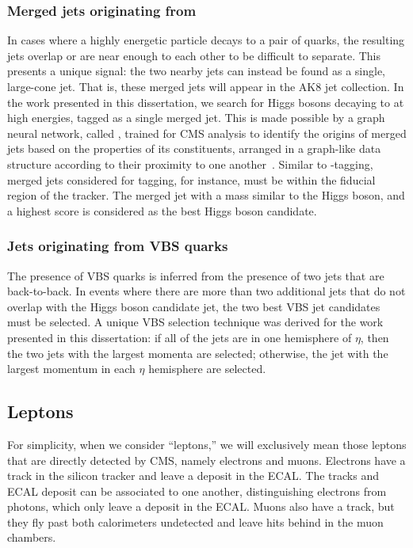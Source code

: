 \subsubsection{Merged jets originating from \Htobb}
In cases where a highly energetic particle decays to a pair of quarks, the resulting jets overlap or are near enough to each other to be difficult to separate. 
This presents a unique signal: the two nearby jets can instead be found as a single, large-cone jet. 
That is, these merged jets will appear in the AK8 jet collection. 
In the work presented in this dissertation, we search for Higgs bosons decaying to \bbbar at high energies, tagged as a single merged jet. 
This is made possible by a graph neural network, called \ParticleNet, trained for CMS analysis to identify the origins of merged jets based on the properties of its constituents, arranged in a graph-like data structure according to their proximity to one another~\cite{Qu:2019gqs}. 
Similar to \Pb-tagging, merged jets considered for \Xtobb tagging, for instance, must be within the fiducial region of the tracker. 
The merged jet with a mass similar to the Higgs boson, and a highest \ParticleNet \Xtobb score is considered as the best Higgs boson candidate.

\subsubsection{Jets originating from VBS quarks}\label{sec:vbsjets}
The presence of VBS quarks is inferred from the presence of two jets that are back-to-back. %
In events where there are more than two additional jets that do not overlap with the Higgs boson candidate jet, the two best VBS jet candidates must be selected. 
A unique VBS selection technique was derived for the work presented in this dissertation: 
if all of the jets are in one hemisphere of $\eta$, then the two jets with the largest momenta are selected; 
otherwise, the jet with the largest momentum in each $\eta$ hemisphere are selected. 

\subsection{Leptons}
For simplicity, when we consider ``leptons,'' we will exclusively mean those leptons that are directly detected by CMS, namely electrons and muons. 
Electrons have a track in the silicon tracker and leave a deposit in the ECAL. 
The tracks and ECAL deposit can be associated to one another, distinguishing electrons from photons, which only leave a deposit in the ECAL. 
Muons also have a track, but they fly past both calorimeters undetected and leave hits behind in the muon chambers. 

